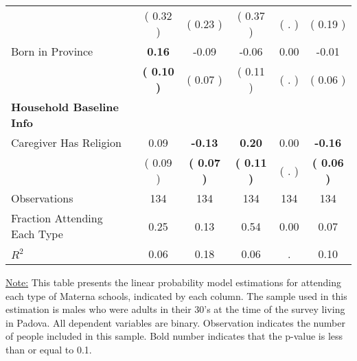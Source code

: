 \begin{table}[H]
{\begin{tabular}{lccccc}
\quad  & (     0.32 ) & (     0.23 )  & (     0.37 )  & (        . ) & (     0.19 ) \\
\quad Born in Province & \textbf{     0.16} &     -0.09 &     -0.06 &      0.00 &     -0.01 \\
\quad  & \textbf{(     0.10 )} & (     0.07 )  & (     0.11 )  & (        . ) & (     0.06 ) \\
\midrule
\textbf{Household Baseline Info} \\
\quad Caregiver Has Religion &      0.09 & \textbf{    -0.13} & \textbf{     0.20} &      0.00 & \textbf{    -0.16} \\
\quad  & (     0.09 ) & \textbf{(     0.07 )}  & \textbf{(     0.11 )}  & (        . ) & \textbf{(     0.06 )} \\
\midrule
Observations & 134 & 134 & 134 & 134 & 134 \\
Fraction Attending Each Type &      0.25 &      0.13 &      0.54 &      0.00 &      0.07 \\
\midrule
$ R^2$ &      0.06 &      0.18 &      0.06 &         . &      0.10 \\
\bottomrule
\end{tabular}}
\end{table}
\begin{footnotesize}
\noindent\underline{Note:} This table presents the linear probability model estimations for attending each type of Materna schools, indicated by each column. The sample used in this estimation is males who were adults in their 30's at the time of the survey living in Padova. All dependent variables are binary. Observation indicates the number of people included in this sample. Bold number indicates that the p-value is less than or equal to 0.1.
\end{footnotesize}
